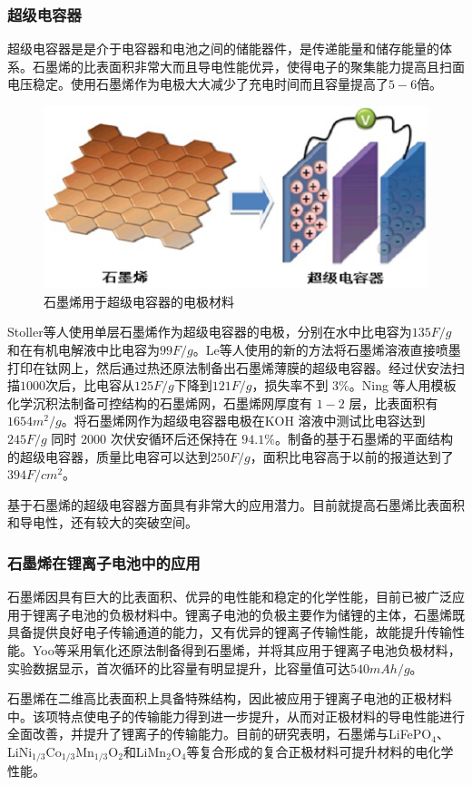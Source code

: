 \subsubsection{超级电容器}
超级电容器是是介于电容器和电池之间的储能器件，是传递能量和储存能量的体系。石墨烯的比表面积非常大而且导电性能优异，使得电子的聚集能力提高且扫面电压稳定。使用石墨烯作为电极大大减少了充电时间而且容量提高了$5-6$倍。\par
\begin{figure}[H]
    \centering
    \includegraphics{img/石墨烯用于超级电容器的电极材料.png}
    \caption{石墨烯用于超级电容器的电极材料}
    \label{fig:my_label}
\end{figure}
Stoller等人使用单层石墨烯作为超级电容器的电极，分别在水中比电容为$135F/g$ 和在有机电解液中比电容为$99F/g$。Le等人使用的新的方法将石墨烯溶液直接喷墨打印在钛网上，然后通过热还原法制备出石墨烯薄膜的超级电容器。经过伏安法扫描$1000 $次后，比电容从$ 125F/g $下降到$121F/g$，损失率不到 $3\%$。Ning 等人用模板化学沉积法制备可控结构的石墨烯网，石墨烯网厚度有 $1-2$ 层，比表面积有$1654m^{2}/g$。将石墨烯网作为超级电容器电极在KOH 溶液中测试比电容达到$245F/g$ 同时 $2000$ 次伏安循环后还保持在 $94.1\%$。制备的基于石墨烯的平面结构的超级电容器，质量比电容可以达到$250F/g$，面积比电容高于以前的报道达到了$394F/cm^{2}$。\par
基于石墨烯的超级电容器方面具有非常大的应用潜力。目前就提高石墨烯比表面积和导电性，还有较大的突破空间。\cite{ref1} \par

\subsubsection{石墨烯在锂离子电池中的应用}
石墨烯因具有巨大的比表面积、优异的电性能和稳定的化学性能，目前已被广泛应用于锂离子电池的负极材料中。锂离子电池的负极主要作为储锂的主体，石墨烯既具备提供良好电子传输通道的能力，又有优异的锂离子传输性能，故能提升传输性能。Yoo等采用氧化还原法制备得到石墨烯，并将其应用于锂离子电池负极材料，实验数据显示，首次循环的比容量有明显提升，比容量值可达$540 mAh/g$。\par
石墨烯在二维高比表面积上具备特殊结构，因此被应用于锂离子电池的正极材料中。该项特点使电子的传输能力得到进一步提升，从而对正极材料的导电性能进行全面改善，并提升了锂离子的传输能力。目前的研究表明，石墨烯与LiFePO$_{4}$、LiNi$_{1/3}$Co$_{1/3}$Mn$_{1/3}$O$_{2}$和LiMn$_{2}$O$_{4}$等复合形成的复合正极材料可提升材料的电化学性能。\cite{ref2} \par

